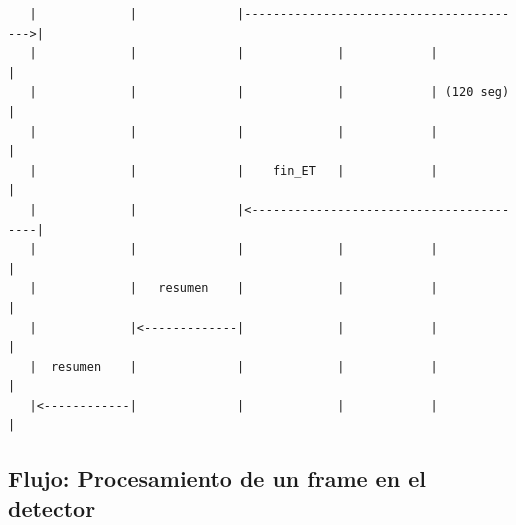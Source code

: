 \documentclass[11pt,a4paper]{article}
\begin{document}
\begin{verbatim}
   |             |              |---------------------------------------->|
   |             |              |             |            |            |
   |             |              |             |            | (120 seg)  |
   |             |              |             |            |            |
   |             |              |    fin_ET   |            |            |
   |             |              |<----------------------------------------|
   |             |              |             |            |            |
   |             |   resumen    |             |            |            |
   |             |<-------------|             |            |            |
   |  resumen    |              |             |            |            |
   |<------------|              |             |            |            |
\end{verbatim}

\subsection{Flujo: Procesamiento de un frame en el detector}
\end{document}
